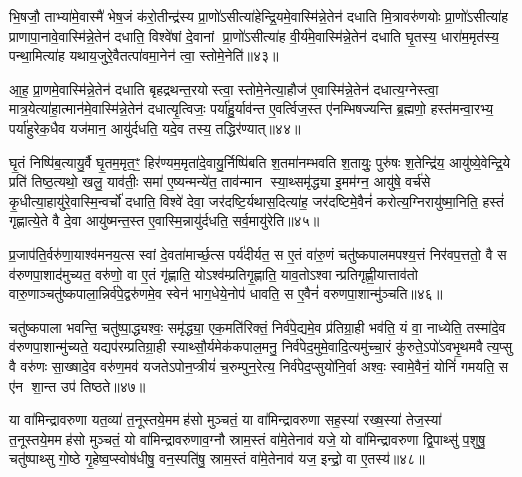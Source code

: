 भि॒षजौ॒ ताभ्या॑मे॒वास्मै॑ भेष॒जं क॑रो॒तीन्द्र॑स्य प्रा॒णो॑ऽसीत्या॑हेन्द्रि॒यमे॒वास्मि॑न्ने॒तेन॑ दधाति मि॒त्रावरु॑णयोः प्रा॒णो॑ऽसीत्या॑ह प्राणापा॒नावे॒वास्मि॑न्ने॒तेन॑ दधाति॒ विश्वे॑षां दे॒वानां प्रा॒णो॑ऽसीत्या॑ह वी॒र्य॑मे॒वास्मि॑न्ने॒तेन॑ दधाति घृ॒तस्य॒ धारा॑म॒मृत॑स्य॒ पन्था॒मित्या॑ह यथाय॒जुरे॒वैतत्पा॑वमा॒नेन॑ त्वा॒ स्तोमे॒नेति॑॥४३॥

आ॒ह॒ प्रा॒णमे॒वास्मि॑न्ने॒तेन॑ दधाति बृहद्रथन्त॒रयोस्त्वा॒ स्तोमे॒नेत्या॒हौज॑ ए॒वास्मि॑न्ने॒तेन॑ दधात्य॒ग्नेस्त्वा॒ मात्र॒येत्या॑हा॒त्मान॑मे॒वास्मि॑न्ने॒तेन॑ दधात्यृ॒त्विजः॒ पर्या॑हु॒र्याव॑न्त ए॒वर्त्विज॒स्त ए॑नम्भिषज्यन्ति ब्र॒ह्मणो॒ हस्त॑मन्वा॒रभ्य॒ पर्या॑हुरेक॒धैव यज॑मान॒ आयु॑र्दधति॒ यदे॒व तस्य॒ तद्धिर॑ण्यात्॥४४॥

घृ॒तं निष्पि॑ब॒त्यायु॒र्वै घृ॒तम॒मृत॒ꣳ॒ हिर॑ण्यम॒मृता॑दे॒वायु॒र्निष्पि॑बति श॒तमा॑नम्भवति श॒तायुः॒ पुरु॑षः श॒तेन्द्रि॑य॒ आयु॑ष्ये॒वेन्द्रि॒ये प्रति॑ तिष्ठ॒त्यथो॒ खलु॒ याव॑तीः॒ समा॑ ए॒ष्यन्मन्ये॑त॒ ताव॑न्मान स्या॒थ्समृ॑द्ध्या इ॒मम॑ग्न॒ आयु॑षे॒ वर्च॑से कृ॒धीत्या॒हायु॑रे॒वास्मि॒न्वर्चो॑ दधाति॒ विश्वे॑ देवा॒ जर॑दष्टि॒र्यथास॒दित्या॑ह॒ जर॑दष्टिमे॒वैनं॑ करोत्य॒ग्निरायु॑ष्मा॒निति॒ हस्तं॑ गृह्णात्ये॒ते वै दे॒वा आयु॑ष्मन्त॒स्त ए॒वास्मि॒न्नायु॑र्दधति॒ सर्व॒मायु॑रेति॥४५॥

{\anuvakamend[{रस॑न्दे॒वाना॒ꣳ॒ स्तोमे॒नेति॒ हिर॑ण्या॒दस॒दिति॒ द्वाविꣳ॑शतिश्च॥11॥}]}

प्र॒जाप॑ति॒र्वरु॑णा॒याश्व॑मनय॒त्स स्वां दे॒वता॑मार्च्छ॒त्स पर्य॑दीर्यत॒ स ए॒तं वा॑रु॒णं चतु॑ष्कपालमपश्य॒त्तं निर॑वप॒त्ततो॒ वै स व॑रुणपा॒शाद॑मुच्यत॒ वरु॑णो॒ वा ए॒तं गृ॑ह्णाति॒ योऽश्व॑म्प्रतिगृ॒ह्णाति॒ याव॒तोऽश्वान्प्रतिगृह्णी॒यात्ताव॑तो वारु॒णाञ्चतु॑ष्कपाला॒न्निर्व॑पे॒द्वरु॑णमे॒व स्वेन॑ भाग॒धेये॒नोप॑ धावति॒ स ए॒वैनं॑ वरुणपा॒शान्मु॑ञ्चति॥४६॥

चतु॑ष्कपाला भवन्ति॒ चतु॑ष्पा॒द्ध्यश्वः॒ समृ॑द्ध्या॒ एक॒मति॑रिक्तं॒ निर्व॑पे॒द्यमे॒व प्र॑तिग्रा॒ही भव॑ति॒ यं वा॒ नाध्येति॒ तस्मा॑दे॒व व॑रुणपा॒शान्मु॑च्यते॒ यद्यप॑रम्प्रतिग्रा॒ही स्याथ्सौ॒र्यमेक॑कपाल॒मनु॒ निर्व॑पेद॒मुमे॒वादि॒त्यमु॑च्चा॒रं कु॑रुते॒ऽपो॑ऽवभृ॒थमवैत्य॒प्सु वै वरु॑णः सा॒ख्षादे॒व वरु॑ण॒मव॑ यजतेऽपोन॒प्त्रीयं॑ च॒रुम्पुन॒रेत्य॒ निर्व॑पेद॒प्सुयो॑नि॒र्वा अश्वः॒ स्वामे॒वैनं॒ योनिं॑ गमयति॒ स ए॑न शा॒न्त उप॑ तिष्ठते॥४७॥

{\anuvakamend[{मु॒ञ्च॒ति॒ च॒रु स॒प्तद॑श च॥12॥}]}

या वा॑मिन्द्रावरुणा यत॒व्या॑ त॒नूस्तये॒ममह॑सो मुञ्चतं॒ या वा॑मिन्द्रावरुणा सह॒स्या॑ रख्ष॒स्या॑ तेज॒स्या॑ त॒नूस्तये॒ममह॑सो मुञ्चतं॒ यो वा॑मिन्द्रावरुणाव॒ग्नौ स्राम॒स्तं वा॑मे॒तेनाव॑ यजे॒ यो वा॑मिन्द्रावरुणा द्वि॒पाथ्सु॑ प॒शुषु॒ चतु॑ष्पाथ्सु गो॒ष्ठे गृ॒हेष्व॒प्स्वोष॑धीषु॒ वन॒स्पति॑षु॒ स्राम॒स्तं वा॑मे॒तेनाव॑ यज॒ इन्द्रो॒ वा ए॒तस्य॑॥४८॥

